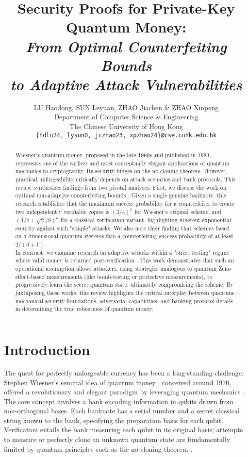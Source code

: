 \documentclass{article} %
\title{Security Proofs for Private-Key Quantum Money:\\
\textit{From Optimal Counterfeiting Bounds \\
to Adaptive Attack Vulnerabilities}}
\author{LU Haodong, SUN Leyuan, ZHAO Jiachen \& ZHAO Xinpeng 
\\
Department of Computer Science \& Engineering\\
The Chinese University of Hong Kong\\
\texttt{\{hdlu24, lysun0, jczhao23, xpzhao24\}@cse.cuhk.edu.hk} 
}
\begin{document}
\maketitle
\begin{abstract}
Wiesner's quantum money, proposed in the late 1960s and published in 1983, represents one of the earliest and most conceptually elegant applications of quantum mechanics to cryptography. Its security hinges on the no-cloning theorem. However, practical unforgeability critically depends on attack scenarios and bank protocols. This review synthesizes findings from two pivotal analyses. First, we discuss the work on optimal non-adaptive counterfeiting bounds \citep{Molina2012Optimal}. Given a single genuine banknote, this research establishes that the maximum success probability for a counterfeiter to create two independently verifiable copies is $(3/4)^n$ for Wiesner's original scheme, and $(3/4 + \sqrt{2}/8)^n$ for a classical-verification variant, highlighting inherent exponential security against such "simple" attacks. We also note their finding that schemes based on $d$-dimensional quantum systems face a counterfeiting success probability of at least $2/(d+1)$. \\
In contrast, we examine research on adaptive attacks within a "strict testing" regime where valid money is returned post-verification \citep{Nagaj2016Adaptive}. This work demonstrates that such an operational assumption allows attackers, using strategies analogous to quantum Zeno effect-based measurements (like bomb-testing or protective measurements), to progressively learn the secret quantum state, ultimately compromising the scheme. By juxtaposing these works, this review highlights the critical interplay between quantum-mechanical security foundations, adversarial capabilities, and banking protocol details in determining the true robustness of quantum money.
\end{abstract}

\section{Introduction}
The quest for perfectly unforgeable currency has been a long-standing challenge. Stephen Wiesner's seminal idea of quantum money \citet{Wiesner1983Conjugate}, conceived around 1970, offered a revolutionary and elegant paradigm by leveraging quantum mechanics \citep{NielsenChuang2010Quantum}. The core concept involves a bank encoding information in qubits drawn from non-orthogonal bases. Each banknote has a serial number and a secret classical string known to the bank, specifying the preparation basis for each qubit. Verification entails the bank measuring each qubit in its original basis; attempts to measure or perfectly clone an unknown quantum state are fundamentally limited by quantum principles such as the no-cloning theorem \citep{WoottersZurek1982Single}.
\end{document}
